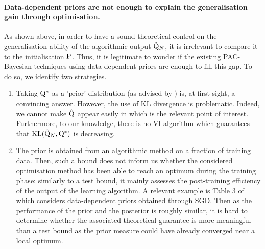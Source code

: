\paragraph{Data-dependent priors are not enough to explain the generalisation gain through optimisation.}
As shown above, in order to have a sound theoretical control on the generalisation ability of the algorithmic output $\hat{\Q}_N$, it is irrelevant to compare it to the initialisation $\P$. Thus, it is legitimate to wonder if the existing PAC-Bayesian techniques using data-dependent priors are enough to fill this gap. To do so, we identify two strategies.
\begin{enumerate}
  \item Taking $\Q^*$ as a 'prior' distribution (as advised by \citealp{dziugaite2017computing}) is, at first sight, a convincing answer. However, the use of KL divergence is problematic. Indeed, we cannot make $\hat{\Q}$ appear easily in  which is the relevant point of interest. Furthermore, to our knowledge, there is no VI algorithm which guarantees that $\operatorname{KL}(\hat{\Q}_N,\Q^*)$ is decreasing.
  \item The prior is obtained from an algorithmic method on a fraction of training data. Then, such a bound does not inform us whether the considered optimisation method has been able to reach an optimum during the training phase: similarly to a test bound, it mainly assesses the post-training efficiency of the output of the learning algorithm. A relevant example is Table 3 of \citet{perezortiz2021learning} which considers data-dependent priors obtained through SGD. Then as the performance of the prior and the posterior is roughly similar, it is hard to determine whether the associated theoretical guarantee is more meaningful than a test bound as the prior measure could have already converged near a local optimum.
\end{enumerate}

